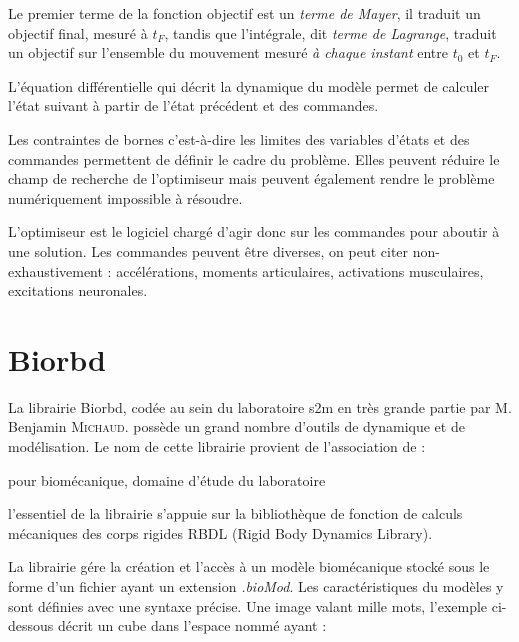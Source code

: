 Le premier terme de la fonction objectif est un \emph{terme de Mayer}, il traduit un objectif final, mesuré à $t_{F}$, tandis que l’intégrale, dit \emph{terme de Lagrange}, traduit un objectif sur l’ensemble du mouvement mesuré \emph{à chaque instant} entre $t_{0}$ et $t_{F}$.

L’équation différentielle qui décrit la dynamique du modèle permet de calculer l’état suivant à partir de l’état précédent et des commandes.

Les contraintes de bornes c’est-à-dire les limites des variables d’états et des commandes permettent de définir le cadre du problème. Elles peuvent réduire le champ de recherche de l’optimiseur mais peuvent également rendre le problème numériquement impossible à résoudre.

L'optimiseur est le logiciel chargé d'agir donc sur les commandes pour aboutir à une solution. Les
commandes peuvent être diverses, on peut citer non-exhaustivement : accélérations, moments articulaires, activations musculaires, excitations neuronales.
        
        \section{Biorbd}
        
        
La librairie Biorbd, codée au sein du laboratoire s2m en très grande partie par M. Benjamin \textsc{Michaud}. possède un grand nombre d’outils de dynamique et de modélisation. Le nom de cette librairie provient de l'association de :

\begin{description}
\setlength\itemsep{-0.5em}
\item[bio :] pour biomécanique, domaine d’étude du laboratoire
\item[rbd :] l’essentiel de la librairie s’appuie sur la bibliothèque de fonction de calculs mécaniques
des corps rigides RBDL (Rigid Body Dynamics Library).
\end{description}

La librairie gére la création et l'accès à un modèle biomécanique stocké sous le forme d'un fichier ayant un extension \emph{.bioMod}. Les caractéristiques du modèles y sont définies avec une syntaxe précise. Une image valant mille mots, l'exemple ci-dessous décrit un cube dans l'espace nommé ayant :

